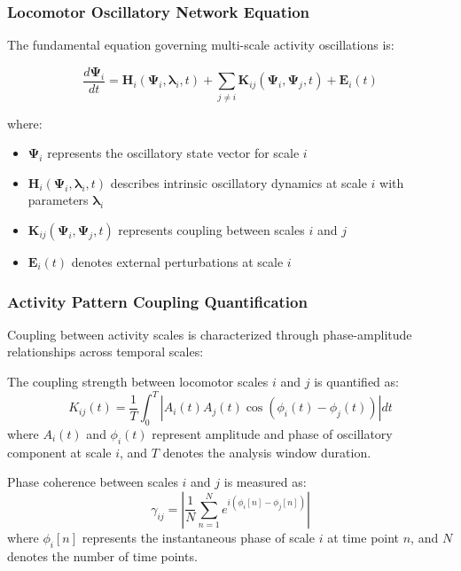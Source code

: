 \subsubsection{Locomotor Oscillatory Network Equation}

The fundamental equation governing multi-scale activity oscillations is:

\begin{equation}
\frac{d\mathbf{\Psi}_i}{dt} = \mathbf{H}_i(\mathbf{\Psi}_i, \boldsymbol{\lambda}_i, t) + \sum_{j \neq i} \mathbf{K}_{ij}(\mathbf{\Psi}_i, \mathbf{\Psi}_j, t) + \mathbf{E}_i(t)
\label{eq:locomotor_network}
\end{equation}

where:
\begin{itemize}
\item $\mathbf{\Psi}_i$ represents the oscillatory state vector for scale $i$
\item $\mathbf{H}_i(\mathbf{\Psi}_i, \boldsymbol{\lambda}_i, t)$ describes intrinsic oscillatory dynamics at scale $i$ with parameters $\boldsymbol{\lambda}_i$
\item $\mathbf{K}_{ij}(\mathbf{\Psi}_i, \mathbf{\Psi}_j, t)$ represents coupling between scales $i$ and $j$
\item $\mathbf{E}_i(t)$ denotes external perturbations at scale $i$
\end{itemize}

\subsubsection{Activity Pattern Coupling Quantification}

Coupling between activity scales is characterized through phase-amplitude relationships across temporal scales:

\begin{definition}
The coupling strength between locomotor scales $i$ and $j$ is quantified as:
\begin{equation}
K_{ij}(t) = \frac{1}{T} \int_0^T \left| A_i(t) A_j(t) \cos(\phi_i(t) - \phi_j(t)) \right| dt
\label{eq:activity_coupling}
\end{equation}
where $A_i(t)$ and $\phi_i(t)$ represent amplitude and phase of oscillatory component at scale $i$, and $T$ denotes the analysis window duration.
\end{definition}

\begin{definition}
Phase coherence between scales $i$ and $j$ is measured as:
\begin{equation}
\gamma_{ij} = \left| \frac{1}{N} \sum_{n=1}^{N} e^{i(\phi_i[n] - \phi_j[n])} \right|
\end{equation}
where $\phi_i[n]$ represents the instantaneous phase of scale $i$ at time point $n$, and $N$ denotes the number of time points.
\end{definition}

